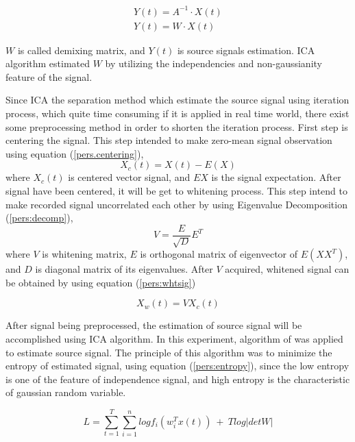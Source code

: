 \documentclass[a4paper]{jpconf}
\begin{document}
\begin{equation}\label{pers:estimation}
\begin{aligned}
Y(t)=A^{-1}\cdot X(t)\\
Y(t)=W\cdot X(t)
\end{aligned}
\end{equation}

$W$ is called demixing matrix, and $Y(t)$ is source signals estimation. ICA algorithm estimated $W$ by utilizing the independencies and non-gaussianity feature of the signal.

Since ICA the separation method which estimate the source signal using iteration process, which quite time consuming if it is applied in real time world, there exist some preprocessing method in order to shorten the iteration process. First step is centering the signal. This step intended to make zero-mean signal observation using equation (\ref{pers.centering}),
\begin{equation}\label{pers.centering}
X_c(t) = X(t) - E(X)
\end{equation}
where $X_c(t)$ is centered vector signal, and $E{X}$ is the signal expectation. After signal have been centered, it will be get to whitening process. This step intend to make recorded signal uncorrelated each other by using Eigenvalue Decomposition (\ref{pers:decomp}),
\begin{equation}\label{pers:decomp}
V = \frac{E}{\sqrt{D}}E^T
\end{equation}
where $V$ is whitening matrix, $E$ is orthogonal matrix of eigenvector of $E(XX^T)$, and $D$ is diagonal matrix of its eigenvalues. After $V$ acquired, whitened signal can be obtained by using equation (\ref{pers:whtsig})

\begin{equation}\label{pers:whtsig}
X_w(t) = V X_c(t)
\end{equation}

After signal being preprocessed, the estimation of source signal will be accomplished using ICA algorithm. In this experiment, algorithm of \cite{5} was applied to estimate source signal. The principle of this algorithm was to minimize the entropy of estimated signal, using equation (\ref{pers:entropy}), since the low entropy is one of the feature of independence signal, and high entropy is the characteristic of gaussian random variable.

\begin{equation}\label{pers:entropy}
L = \sum_{t=1}^T \sum_{i=1}^n log f_i \left(w_i^T x(t)\right) ~+~ T log |det W|
\end{equation}
\end{document}
